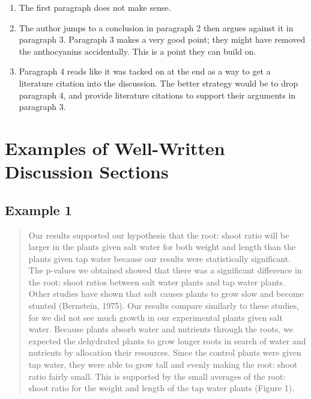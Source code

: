 \documentclass[
]{book}
\providecommand{\tightlist}{%
  \setlength{\itemsep}{0pt}\setlength{\parskip}{0pt}}
\begin{document}
\begin{enumerate}
\def\labelenumi{\arabic{enumi}.}
\tightlist
\item
  The first paragraph does not make sense.
\item
  The author jumps to a conclusion in paragraph 2 then argues against it in paragraph 3.
  Paragraph 3 makes a very good point; they might have removed the anthocyanins accidentally. This is a point they can build on.
\item
  Paragraph 4 reads like it was tacked on at the end as a way to get a literature citation into the discussion. The better strategy would be to drop paragraph 4, and provide literature citations to support their arguments in paragraph 3.
\end{enumerate}

\hypertarget{examples-of-well-written-discussion-sections}{%
\section{Examples of Well-Written Discussion Sections}\label{examples-of-well-written-discussion-sections}}

\hypertarget{example-1-9}{%
\subsection{Example 1}\label{example-1-9}}

\begin{quote}
Our results supported our hypothesis that the root: shoot ratio will be larger in the plants given salt water for both weight and length than the plants given tap water because our results were statistically significant. The p-values we obtained showed that there was a significant difference in the root: shoot ratios between salt water plants and tap water plants. Other studies have shown that salt causes plants to grow slow and become stunted (Bernstein, 1975). Our results compare similarly to these studies, for we did not see much growth in our experimental plants given salt water. Because plants absorb water and nutrients through the roots, we expected the dehydrated plants to grow longer roots in search of water and nutrients by allocation their resources. Since the control plants were given tap water, they were able to grow tall and evenly making the root: shoot ratio fairly small. This is supported by the small averages of the root: shoot ratio for the weight and length of the tap water plants (Figure 1).
\end{quote}
\end{document}
